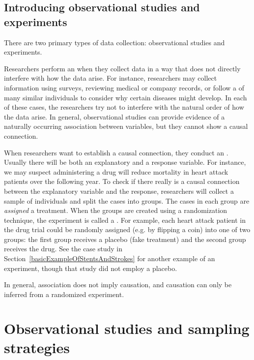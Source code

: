 
\subsection{Introducing observational studies and experiments}

There are two primary types of data collection: observational studies and experiments.

Researchers perform an  when they collect data in a way that does not directly interfere with how the data arise. For instance, researchers may collect information using surveys, reviewing medical or company records, or follow a  of many similar individuals to consider why certain diseases might develop. In each of these cases, the researchers try not to interfere with the natural order of how the data arise. In general, observational studies can provide evidence of a naturally occurring association between variables, but they cannot show a causal connection.

When researchers want to establish a causal connection, they conduct an . Usually there will be both an explanatory and a response variable. For instance, we may suspect administering a drug will reduce mortality in heart attack patients over the following year. To check if there really is a causal connection between the explanatory variable and the response, researchers will collect a sample of individuals and split the cases into groups. The cases in each group are \emph{assigned} a treatment. When the groups are created using a randomization technique, the experiment is called a . For example, each heart attack patient in the drug trial could be randomly assigned (e.g. by flipping a coin) into one of two groups: the first group receives a placebo (fake treatment) and the second group receives the drug. See the case study in Section~\ref{basicExampleOfStentsAndStrokes} for another example of an experiment, though that study did not employ a placebo.

\begin{tipBox}{
In general, association does not imply causation, and causation can only be inferred from a randomized experiment.}
\end{tipBox}


\section{Observational studies and sampling strategies}

